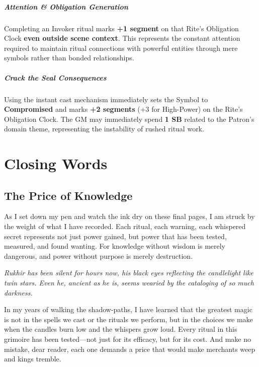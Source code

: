 \documentclass[12pt,twoside]{book}
\newcommand{\shadow}[1]{\textit{#1}}
\begin{document}
\paragraph{Attention & Obligation Generation} Completing an Invoker ritual marks \textbf{+1 segment} on that Rite's Obligation Clock \textbf{even outside scene context}. This represents the constant attention required to maintain ritual connections with powerful entities through mere symbols rather than bonded relationships.

\paragraph{Crack the Seal Consequences} Using the instant cast mechanism immediately sets the Symbol to \textbf{Compromised} and marks \textbf{+2 segments} (+3 for High-Power) on the Rite's Obligation Clock. The GM may immediately spend \textbf{1 SB} related to the Patron's domain theme, representing the instability of rushed ritual work.

\chapter{Closing Words}

\section*{The Price of Knowledge}

\lettrine[lines=3]{A}{}s I set down my pen and watch the ink dry on these final pages, I am struck by the weight of what I have recorded. Each ritual, each warning, each whispered secret represents not just power gained, but power that has been tested, measured, and found wanting. For knowledge without wisdom is merely dangerous, and power without purpose is merely destruction.

\shadow{Rukhir has been silent for hours now, his black eyes reflecting the candlelight like twin stars. Even he, ancient as he is, seems wearied by the cataloging of so much darkness.}

In my years of walking the shadow-paths, I have learned that the greatest magic is not in the spells we cast or the rituals we perform, but in the choices we make when the candles burn low and the whispers grow loud. Every ritual in this grimoire has been tested—not just for its efficacy, but for its cost. And make no mistake, dear reader, each one demands a price that would make merchants weep and kings tremble.
\end{document}
